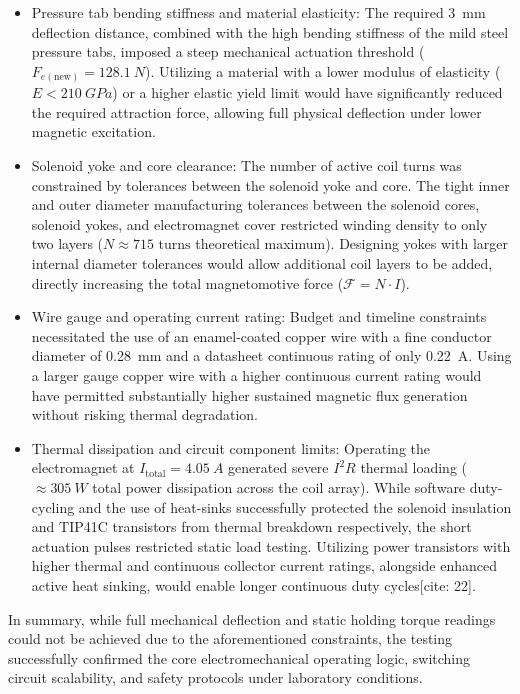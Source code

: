 \begin{itemize}
	\item Pressure tab bending stiffness and material elasticity: The required \SI{3}{mm} deflection distance, combined with the high bending stiffness of the mild steel pressure tabs, imposed a steep mechanical actuation threshold ($F_{e(\text{new})} = \SI{128.1}{N}$). Utilizing a material with a lower modulus of elasticity ($E < \SI{210}{GPa}$) or a higher elastic yield limit would have significantly reduced the required attraction force, allowing full physical deflection under lower magnetic excitation.
	
	\item Solenoid yoke and core clearance: The number of active coil turns was constrained by tolerances between the solenoid yoke and core. The tight inner and outer diameter manufacturing tolerances between the solenoid cores, solenoid yokes, and electromagnet cover restricted winding density to only two layers ($N \approx 715\text{ turns}$ theoretical maximum). Designing yokes with larger internal diameter tolerances would allow additional coil layers to be added, directly increasing the total magnetomotive force ($\mathcal{F} = N \cdot I$).
	
	\item Wire gauge and operating current rating: Budget and timeline constraints necessitated the use of an enamel-coated copper wire with a fine conductor diameter of \SI{0.28}{mm} and a datasheet continuous rating of only \SI{0.22}{A}. Using a larger gauge copper wire with a higher continuous current rating would have permitted substantially higher sustained magnetic flux generation without risking thermal degradation.
	
	\item Thermal dissipation and circuit component limits: Operating the electromagnet at $I_{\text{total}} = \SI{4.05}{A}$ generated severe $I^2 R$ thermal loading ($\approx \SI{305}{W}$ total power dissipation across the coil array). While software duty-cycling and the use of heat-sinks successfully protected the solenoid insulation and TIP41C transistors from thermal breakdown respectively, the short actuation pulses restricted static load testing. Utilizing power transistors with higher thermal and continuous collector current ratings, alongside enhanced active heat sinking, would enable longer continuous duty cycles[cite: 22].
\end{itemize}

In summary, while full mechanical deflection and static holding torque readings could not be achieved due to the aforementioned constraints, the testing successfully confirmed the core electromechanical operating logic, switching circuit scalability, and safety protocols under laboratory conditions.
